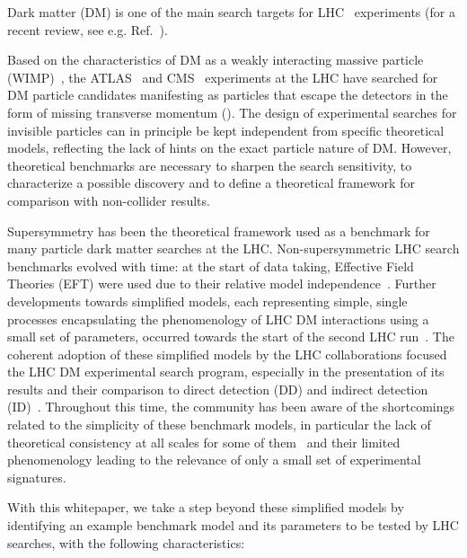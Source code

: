 
Dark matter (DM) is one of the main search targets for LHC~\cite{LHC2008} experiments (for a recent review, see e.g. Ref.~\cite{Kahlhoefer:2017dnp}). 

Based on the characteristics of DM as a weakly interacting massive particle (WIMP)~\cite{Bertone:2004pz}, the ATLAS~\cite{ATLAS2008} and CMS~\cite{CMS2008} experiments at the LHC have searched for DM particle candidates manifesting as particles that escape the detectors in the form of missing transverse momentum (\MET). 
The design of experimental searches for invisible particles can in principle be kept independent from specific theoretical models, reflecting the lack of hints on the exact particle nature of DM. 
However, theoretical benchmarks are necessary to sharpen the search sensitivity, to characterize a possible discovery and to define a theoretical framework for comparison with non-collider results. 

Supersymmetry has been the theoretical framework used as a benchmark for many particle dark matter searches at the LHC. 
Non-supersymmetric LHC search benchmarks evolved with time: at the start of data taking, Effective Field Theories (EFT) were used due to their relative model independence~\cite{Cao:2009uw,Beltran:2010ww,Goodman:2010yf,Bai:2010hh,Goodman:2010ku,Fox:2011pm}.  
Further developments towards simplified models, each representing simple, single processes encapsulating the phenomenology of LHC DM interactions using a small set of parameters, occurred towards the start of the second LHC run~\cite{Abercrombie:2015wmb}. 
The coherent adoption of these simplified models by the LHC collaborations focused the LHC DM experimental search program, especially in the presentation of its results and their comparison to direct detection (DD) and indirect detection (ID)~\cite{Boveia:2016mrp,Albert:2017onk,CMSSummary,ATLASSummary}. 
Throughout this time, the community has been aware of the shortcomings related to the simplicity of these benchmark models, in particular the lack of theoretical consistency at all scales for some of them~\cite{Bell:2015sza,Ko:2016zxg,Englert:2016joy,Kahlhoefer:2015bea} and their limited phenomenology leading to the relevance of only a small set of experimental signatures.  

With this whitepaper, we take a step beyond these simplified models by identifying an example benchmark model and its parameters to be tested by LHC searches, with the following characteristics: 

